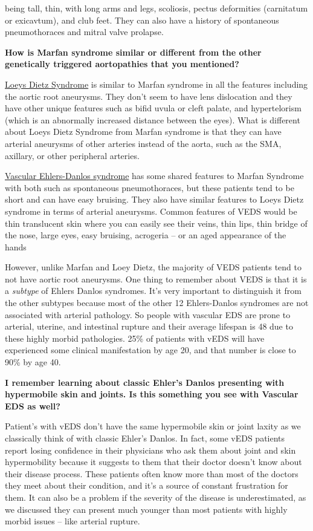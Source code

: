 \documentclass[
]{book}
\begin{document}
being tall, thin, with long arms and legs, scoliosis, pectus deformities
(carnitatum or exicavtum), and club feet. They can also have a history
of spontaneous pneumothoraces and mitral valve prolapse.

\textbf{How is Marfan syndrome similar or different from the other genetically
triggered aortopathies that you mentioned?}

\uline{Loeys Dietz Syndrome} is similar to Marfan syndrome in all
the features including the aortic root aneurysms. They don't seem to
have lens dislocation and they have other unique features such as bifid
uvula or cleft palate, and hypertelorism (which is an abnormally
increased distance between the eyes). What is different about Loeys
Dietz Syndrome from Marfan syndrome is that they can have arterial
aneurysms of other arteries instead of the aorta, such as the SMA,
axillary, or other peripheral arteries.

\uline{Vascular Ehlers-Danlos syndrome} has some shared features
to Marfan Syndrome with both such as spontaneous pneumothoraces, but
these patients tend to be short and can have easy bruising. They also
have similar features to Loeys Dietz syndrome in terms of arterial
aneurysms. Common features of VEDS would be thin translucent skin where
you can easily see their veins, thin lips, thin bridge of the nose,
large eyes, easy bruising, acrogeria -- or an aged appearance of the
hands

However, unlike Marfan and Loey Dietz, the majority of VEDS patients
tend to not have aortic root aneurysms. One thing to remember about VEDS
is that it is a \emph{subtype} of Ehlers Danlos syndromes. It's very
important to distinguish it from the other subtypes because most of the
other 12 Ehlers-Danlos syndromes are not associated with arterial
pathology. So people with vascular EDS are prone to arterial, uterine,
and intestinal rupture and their average lifespan is 48 due to these
highly morbid pathologies. 25\% of patients with vEDS will have
experienced some clinical manifestation by age 20, and that number is
close to 90\% by age 40.

\textbf{I remember learning about classic Ehler's Danlos presenting with
hypermobile skin and joints. Is this something you see with Vascular EDS
as well?}

Patient's with vEDS don't have the same hypermobile skin or joint laxity
as we classically think of with classic Ehler's Danlos. In fact, some
vEDS patients report losing confidence in their physicians who ask them
about joint and skin hypermobility because it suggests to them that
their doctor doesn't know about their disease process. These patients
often know more than most of the doctors they meet about their
condition, and it's a source of constant frustration for them. It can
also be a problem if the severity of the disease is underestimated, as
we discussed they can present much younger than most patients with
highly morbid issues -- like arterial rupture.
\end{document}
